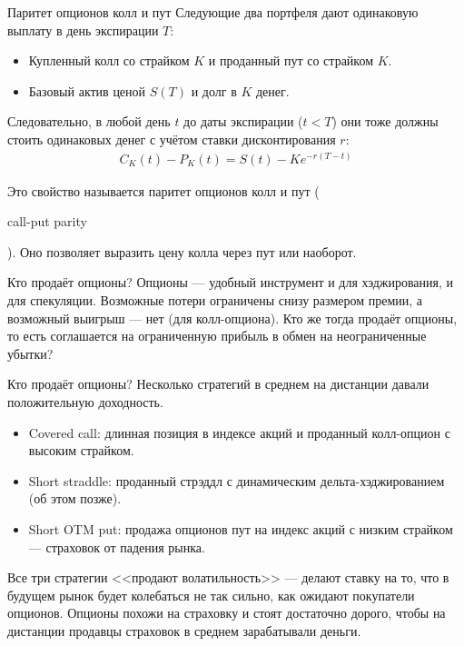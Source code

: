 \documentclass{beamer}
\newcommand{\en}[1]{\begin{otherlanguage}{english}#1\end{otherlanguage}}
\begin{document}
\begin{frame}{Паритет опционов колл и пут}
\justify
Следующие два портфеля дают одинаковую выплату в день экспирации $T$:
\begin{itemize}
\justifying
\item Купленный колл со страйком $K$ и проданный пут со страйком $K$.
\item Базовый актив ценой $S(T)$ и долг в $K$ денег.
\end{itemize}

\justify
Следовательно, в любой день $t$ до даты экспирации ($t<T$) они тоже должны стоить одинаковых денег с учётом ставки дисконтирования $r$:
\begin{align*}
C_K(t) - P_K(t) = S(t) - Ke^{-r(T-t)}
\end{align*}

\justify
Это свойство называется \alert{паритет опционов колл и пут} (\en{call-put parity}). Оно позволяет выразить цену колла через пут или наоборот.
\end{frame}



\begin{frame}{Кто продаёт опционы?}
\justify
Опционы --- удобный инструмент и для хэджирования, и для спекуляции. Возможные потери ограничены снизу размером премии, а возможный выигрыш --- нет (для колл-опциона). Кто же тогда продаёт опционы, то есть соглашается на ограниченную прибыль в обмен на неограниченные убытки?
\end{frame}



\begin{frame}{Кто продаёт опционы?}
\justify
Несколько стратегий в среднем на дистанции давали положительную доходность.

\justify
\begin{itemize}
\justifying
\item Covered call: длинная позиция в индексе акций и проданный колл-опцион с высоким страйком.
\item Short straddle: проданный стрэддл с динамическим дельта-хэджированием (об этом позже).
\item Short OTM put: продажа опционов пут на индекс акций с низким страйком --- страховок от падения рынка.
\end{itemize}

\justify
Все три стратегии <<продают волатильность>> --- делают ставку на то, что в будущем рынок будет колебаться не так сильно, как ожидают покупатели опционов. Опционы похожи на страховку и стоят достаточно дорого, чтобы на дистанции продавцы страховок в среднем зарабатывали деньги.
\end{frame}
\end{document}
